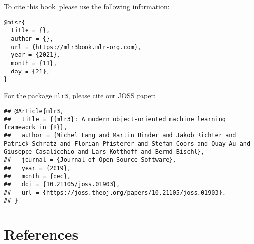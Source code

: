 \documentclass[
]{scrbook}
\begin{document}
To cite this book, please use the following information:

\begin{verbatim}
@misc{
  title = {},
  author = {},
  url = {https://mlr3book.mlr-org.com},
  year = {2021},
  month = {11},
  day = {21},
}
\end{verbatim}

For the package \texttt{mlr3}, please cite our JOSS paper:

\begin{verbatim}
## @Article{mlr3,
##   title = {{mlr3}: A modern object-oriented machine learning framework in {R}},
##   author = {Michel Lang and Martin Binder and Jakob Richter and Patrick Schratz and Florian Pfisterer and Stefan Coors and Quay Au and Giuseppe Casalicchio and Lars Kotthoff and Bernd Bischl},
##   journal = {Journal of Open Source Software},
##   year = {2019},
##   month = {dec},
##   doi = {10.21105/joss.01903},
##   url = {https://joss.theoj.org/papers/10.21105/joss.01903},
## }
\end{verbatim}

\hypertarget{references}{%
\chapter*{References}\label{references}}
\end{document}
